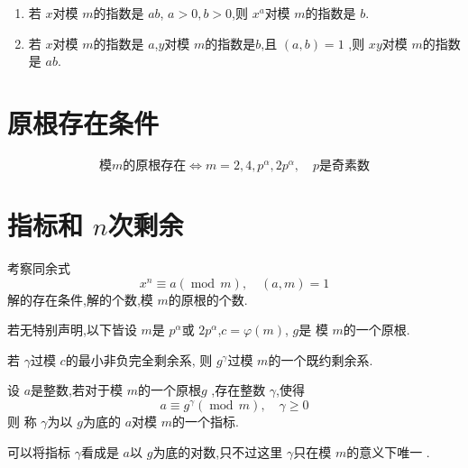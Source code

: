\documentclass[lang=cn,12pt,color=green,fontset=none]{elegantbook}
\begin{document}
\begin{theorem}
   \begin{enumerate}
    \item  若 \(  x  \)对模 \(  m  \)的指数是 \(  ab  \), \(  a>0,b>0  \),则 \(  x^{a}  \)对模 \(  m  \)的指数是 \(  b  \).       
    \item 若 \(  x  \)对模 \(  m  \)的指数是 \(  a  \),\(  y  \)对模 \(  m  \)的指数是\(  b  \),且 \(  \left( a,b \right)= 1   \)      ,则 \(  xy  \)对模 \(  m  \)的指数是 \(  ab  \).   
   \end{enumerate}
   
\end{theorem}

\section{原根存在条件}

\begin{theorem}
     \[
     \text{模}m\text{的原根存在} \iff  m= 2,4,p^{\alpha },2p^{\alpha },\quad p\text{是奇素数}
     \] 
\end{theorem}

\section{指标和 \(  n  \)次剩余  }

考察同余式 \[
x^{n}\equiv a\left( \operatorname{mod}\,m \right),\quad \left( a,m \right)= 1  
\]解的存在条件,解的个数,模 \(  m  \)的原根的个数. 

若无特别声明,以下皆设 \(  m   \)是 \(  p^{ \alpha }  \)或 \(  2p^{ \alpha }  \),\(  c =  \varphi \left( m \right)   \), \(  g  \)是 模 \(  m  \)的一个原根.


\begin{theorem}
    若 \(   \gamma   \)过模 \(  c  \)的最小非负完全剩余系, 则 \(  g^{ \gamma }  \)过模 \(  m  \)的一个既约剩余系.   
\end{theorem}


\begin{definition}
    设 \(  a  \)是整数,若对于模 \(  m  \)的一个原根\(  g  \) ,存在整数 \(   \gamma   \),使得 \[
    a \equiv g^{ \gamma }\left( \operatorname{mod}\,m \right) ,\quad \gamma \ge 0
    \]   则 称 \(   \gamma   \)为以 \(  g  \)为底的 \(  a  \)对模 \(  m  \)的一个指标.    
\end{definition}

\begin{remark}
    可以将指标 \(   \gamma   \)看成是 \(  a  \)以 \(  g  \)为底的对数,只不过这里 \(   \gamma   \)只在模 \(  m  \)的意义下唯一 .   
\end{remark}
\end{document}
